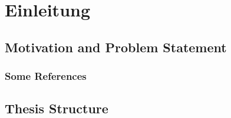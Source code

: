 %
\chapter{Einleitung}
\label{sec:intro}


\section{Motivation and Problem Statement}
\label{sec:intro:motivation}



\subsection{Some References}
\label{sec:intro:results:refs}
\cite{WEB:GNU:GPL:2010,WEB:Miede:2011}

\section{Thesis Structure}
\label{sec:intro:structure}
